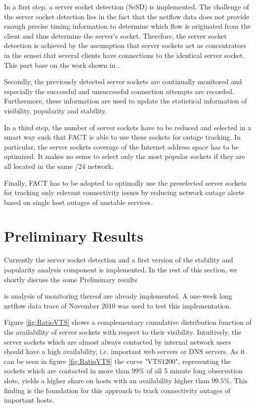 \documentclass{sigcomm-alternate}
\begin{document}
In a first step, a server socket detection (SeSD) is implemented. The
challenge of the server socket detection lies in the fact that the
netflow data does not provide enough precise timing information to
determine which flow is originated from the client and thus determine
the server's socket. Therefore, the server socket detection is
achieved by the assumption that server sockets act as concentrators
in the sensei that several clients have connections to the identical
server socket. This part base on the work shown in \cite{TechReport}.

Secondly, the previously detected server sockets are continually
monitored and especially the successful and unsuccessful connection
attempts are recorded. Furthermore, these information are used to update
the statistical information of visibility, popularity and stability.

In a third step, the number of server sockets have to be reduced and
selected in a smart way such that FACT is able to use these sockets
for outage tracking. In particular, the server sockets coverage of the
Internet address space has to be optimized. It makes no sense to select
only the most popular sockets if they are all located in the same /24
network.

Finally, FACT has to be adopted to optimally use the preselected server
sockets for tracking only relevant connectivity issues by reducing
network outage alerts based on single host outages of unstable services.

\section{Preliminary Results} 
Currently the server socket detection and a first version of the 
stability and popularity analysis component is implemented. In the 
rest of this section, we shortly discuss the some Preliminary 
results 



is analysis of monitoring thereof are 
already implemented. A one-week long netflow data trace of November 
2010 was used to test this implementation. 



Figure \ref{fig:RatioVTS} shows a complementary cumulative distribution
function of the availability of server sockets with respect to their
visibility. Intuitively, the server sockets which are almost always
contacted by internal network users should have a high availability,
i.e. important web servers or DNS servers. As it can be seen in
figure \ref{fig:RatioVTS} the curve "VTS1200", representing the
sockets which are contacted in more than $99\%$ of all 5 minute
long observation slots, yields a higher share on hosts with an
availability higher than $99.5\%$. This finding is the foundation
for this approach to track connectivity outages of important hosts.
\end{document}
